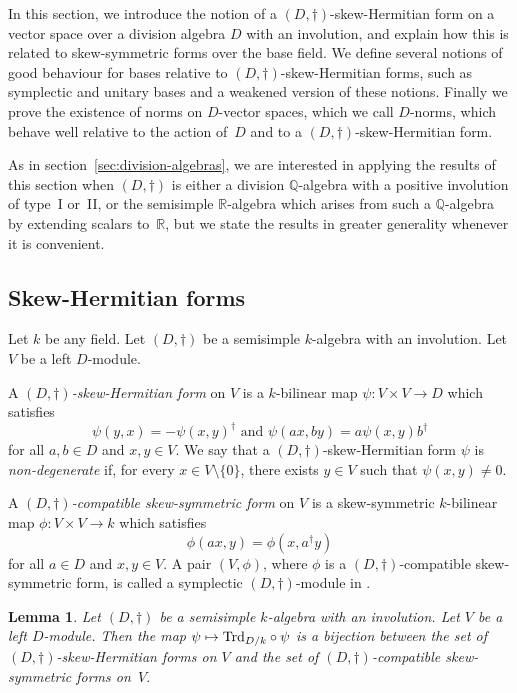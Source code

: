 \documentclass[11pt]{article}
\numberwithin{equation}{section}
\def\mto{\mathchoice{\longmapsto}{\mapsto}{\mapsto}{\mapsto}}
\newcommand{\bQ}{\mathbb{Q}}
\newcommand{\bR}{\mathbb{R}}
\DeclareMathOperator{\Trd}{Trd}
\newcommand{\defterm}[1]{\emph{#1}}
\newtheorem{lemma}{Lemma}[section]
\begin{document}
In this section, we introduce the notion of a $(D,\dag)$-skew-Hermitian form on a vector space over a division algebra $D$ with an involution, and explain how this is related to skew-symmetric forms over the base field. We define several notions of good behaviour for bases relative to $(D,\dag)$-skew-Hermitian forms, such as symplectic and unitary bases and a weakened version of these notions. Finally we prove the existence of norms on $D$-vector spaces, which we call $D$-norms, which behave well relative to the action of~$D$ and to a $(D,\dag)$-skew-Hermitian form.

As in section~\ref{sec:division-algebras}, we are interested in applying the results of this section when $(D, \dag)$ is either a division $\bQ$-algebra with a positive involution of type~I or~II, or the semisimple $\bR$-algebra which arises from such a $\bQ$-algebra by extending scalars to~$\bR$, but we state the results in greater generality whenever it is convenient.

\subsection{Skew-Hermitian forms} \label{subsec:skew-hermitian-forms}

Let $k$ be any field.
Let $(D, \dag)$ be a semisimple $k$\nobreakdash-algebra with an involution.
Let $V$ be a left $D$-module.

A \defterm{$(D,\dag)$-skew-Hermitian form} on $V$ is a $k$-bilinear map $\psi \colon V \times V \to D$ which satisfies
\[
\psi(y,x) = -\psi(x,y)^\dag \text{ and } \psi(ax, by) = a\psi(x,y)b^\dag
\]
for all $a, b \in D$ and $x,y \in V$.
We say that a $(D,\dag)$-skew-Hermitian form $\psi$ is \defterm{non-degenerate} if, for every $x \in V \setminus \{0\}$, there exists $y \in V$ such that $\psi(x,y) \neq 0$.

A \defterm{$(D,\dag)$-compatible skew-symmetric form} on $V$ is a skew-symmetric $k$-bilinear map $\phi \colon V \times V \to k$ which satisfies
\[
\phi(ax, y) = \phi(x, a^\dag y)
\]
for all $a \in D$ and $x,y \in V$.
A pair $(V,\phi)$, where $\phi$ is a $(D,\dag)$-compatible skew-symmetric form, is called a symplectic $(D,\dag)$-module in \cite[\S 8]{Mil05}.

\begin{lemma} \label{tr-skew-hermitian-form}
Let $(D, \dag)$ be a semisimple $k$-algebra with an involution.
Let $V$ be a left $D$-module.
Then the map $\psi \mto {\Trd_{D/k}} \circ \psi$ is a bijection between the set of $(D,\dag)$-skew-Hermitian forms on $V$ and the set of $(D,\dag)$-compatible skew-symmetric forms on~$V$.
\end{lemma}
\end{document}
